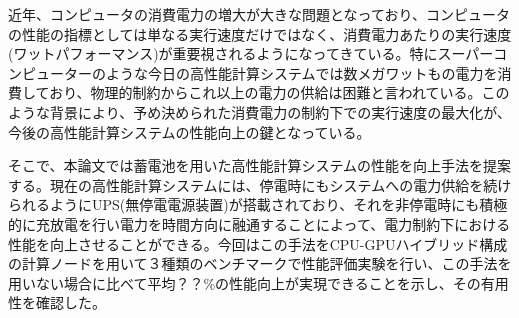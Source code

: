 近年、コンピュータの消費電力の増大が大きな問題となっており、コンピュータの性能の指標としては単なる実行速度だけではなく、消費電力あたりの実行速度(ワットパフォーマンス)が重要視されるようになってきている。特にスーパーコンピューターのような今日の高性能計算システムでは数メガワットもの電力を消費しており、物理的制約からこれ以上の電力の供給は困難と言われている。このような背景により、予め決められた消費電力の制約下での実行速度の最大化が、今後の高性能計算システムの性能向上の鍵となっている。

そこで、本論文では蓄電池を用いた高性能計算システムの性能を向上手法を提案する。現在の高性能計算システムには、停電時にもシステムへの電力供給を続けられるようにUPS(無停電電源装置)が搭載されており、それを非停電時にも積極的に充放電を行い電力を時間方向に融通することによって、電力制約下における性能を向上させることができる。今回はこの手法をCPU-GPUハイブリッド構成の計算ノードを用いて３種類のベンチマークで性能評価実験を行い、この手法を用いない場合に比べて平均？？\%の性能向上が実現できることを示し、その有用性を確認した。